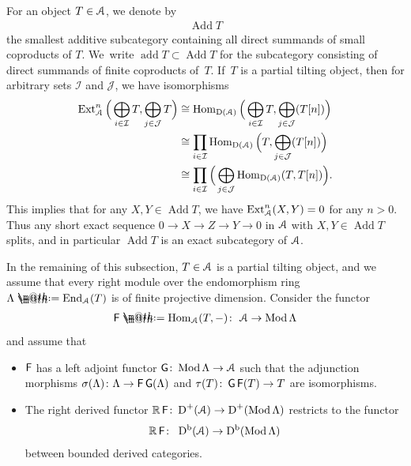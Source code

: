 \documentclass[11pt]{article}
\makeatletter
\numberwithin{equation}{section}
\newcommand*{\defeq}{\mathrel{\rlap{%
 \raisebox{0.3ex}{$\m@th\cdot$}}%
 \raisebox{-0.3ex}{$\m@th\cdot$}}%
 =}
\numberwithin{equation}{section}
\newcommand{\Hom}{\operatorname{Hom}}
\newcommand{\Ext}{\operatorname{Ext}}
\newcommand{\End}{\operatorname{End}}
\newcommand{\Mod}{\operatorname{Mod}}
\newcommand{\add}{\operatorname{add}}
\newcommand{\Add}{\operatorname{Add}}
\newcommand{\Db}{\operatorname{D^b}}
\newcommand{\D}{\operatorname{D}}
\newcommand{\cI}{\mathcal{I}}
\newcommand{\cJ}{\mathcal{J}}
\newcommand{\bR}{\mathbb{R}}
\newcommand{\scrA}{\EuScript{A}}
\newcommand{\F}{\operatorname{\sf{F}}}
\newcommand{\G}{\operatorname{\sf{G}}}
\makeatother
\begin{document}
For an object $T\in \scrA$, we denote by
\begin{gather*}
\Add T
\end{gather*}
the smallest additive subcategory containing all direct summands of small coproducts of $T$. We~write $\add T\subset \Add T$ for the subcategory consisting of direct summands of finite coproducts of~$T$. If~$T$ is a partial tilting object, then for arbitrary sets $\cI$ and $\cJ$, we have isomorphisms
\begin{align*}
\Ext^n_{\scrA}\Big(\bigoplus_{i\in \cI}T,\bigoplus_{j\in \cJ}T\Big) &\cong\Hom_{\D(\scrA)}\Big(\bigoplus_{i\in \cI}T,\bigoplus_{j\in \cJ}(T[n])\Big)
\\
&\cong \prod_{i\in \cI}\Hom_{\D(\scrA)}\Big(T,\bigoplus_{j\in \cJ}(T[n])\Big)
\\
&\cong \prod_{i\in\cI}\Big(\bigoplus_{j\in\cJ}\Hom_{\D(\scrA)}(T,T[n])\Big).
\end{align*}
This implies that for any $X,Y\in \Add T$, we have $\Ext_{\scrA}^n(X,Y)=0$ for any $n>0$. Thus any short exact sequence $0\to X\to Z\to Y\to0$ in $\scrA$ with $X,Y\in \Add T$ splits, and in particular $\Add T$ is an exact subcategory of $\scrA$.

In the remaining of this subsection, $T\in\scrA$ is a partial tilting object, and we assume that every right module over the endomorphism ring $\Lambda\defeq\End_{\scrA}(T)$ is of finite projective dimension. Consider the functor
 \begin{gather*}
{\F}\defeq\Hom_{\scrA}(T,-)\colon\ \scrA\to\Mod\Lambda
 \end{gather*}
and assume that
\begin{itemize}\itemsep=0pt
 \item[$(i)$] $\F$ has a left adjoint functor $\G\colon\Mod\Lambda\to \scrA$ such that the adjunction morphisms $\sigma({\Lambda})\colon \Lambda\to \F\G(\Lambda)$ and $\tau(T)\colon \G\F(T)\to T$ are isomorphisms.

 \item[$(ii)$] The right derived functor $\bR \F\colon \D^+(\scrA)\to \D^+(\Mod\Lambda)$ restricts to the functor
\begin{gather*}
 \bR \F\colon\ \Db(\scrA)\to \Db(\Mod\Lambda)
 \end{gather*}
 between bounded derived categories.
 \end{itemize}
\end{document}
